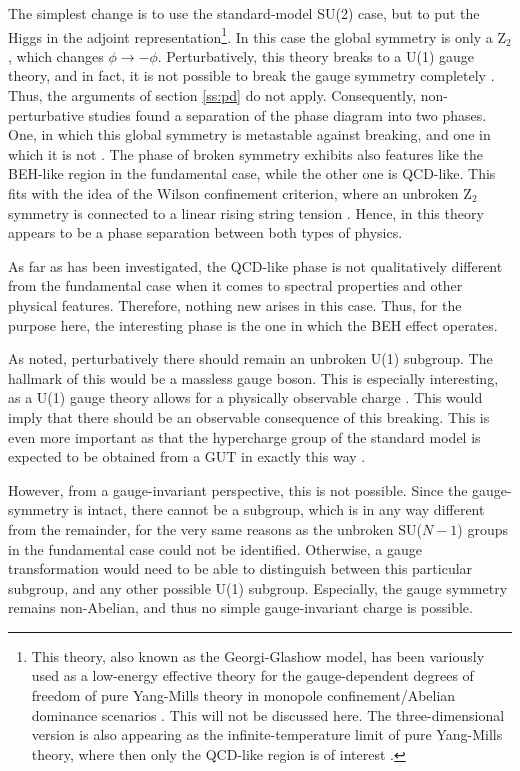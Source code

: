 \documentclass[final,12pt,3p,longtitle]{elsarticle}
\newcommand*{\1}{1\!\!\!\bot}
\begin{document}
The simplest change is to use the standard-model SU(2) case, but to put the Higgs in the adjoint representation\footnote{This theory, also known as the Georgi-Glashow model, has been variously used as a low-energy effective theory for the gauge-dependent degrees of freedom of pure Yang-Mills theory in monopole confinement/Abelian dominance scenarios \cite{Greensite:2011zz,Ripka:2003vv,Kondo:2016ywd}. This will not be discussed here. The three-dimensional version is also appearing as the infinite-temperature limit of pure Yang-Mills theory, where then only the QCD-like region is of interest \cite{Kajantie:1995dw,Maas:2011se,Hart:1999dj}.}. In this case the global symmetry is only a Z$_2$, which changes $\phi\to-\phi$. Perturbatively, this theory breaks to a U(1) gauge theory, and in fact, it is not possible to break the gauge symmetry completely \cite{O'Raifeartaigh:1986vq}. Thus, the arguments of section \ref{ss:pd} do not apply. Consequently, non-perturbative studies found a separation of the phase diagram into two phases. One, in which this global symmetry is metastable against breaking, and one in which it is not \cite{Lang:1981qg,Drouffe:1984hb,Baier:1986ni,Capri:2012cr,Kondo:2016ywd}. The phase of broken symmetry exhibits also features like the BEH-like region in the fundamental case, while the other one is QCD-like. This fits with the idea of the Wilson confinement criterion, where an unbroken Z$_2$ symmetry is connected to a linear rising string tension \cite{Greensite:2011zz,Gattringer:2010zz}. Hence, in this theory appears to be a phase separation between both types of physics.

As far as has been investigated, the QCD-like phase is not qualitatively different from the fundamental case when it comes to spectral properties and other physical features. Therefore, nothing new arises in this case. Thus, for the purpose here, the interesting phase is the one in which the BEH effect operates. 

As noted, perturbatively there should remain an unbroken U(1) subgroup. The hallmark of this would be a massless gauge boson. This is especially interesting, as a U(1) gauge theory allows for a physically observable charge \cite{Haag:1992hx}. This would imply that there should be an observable consequence of this breaking. This is even more important as that the hypercharge group of the standard model is expected to be obtained from a GUT in exactly this way \cite{Bohm:2001yx,Langacker:1980js}.

However, from a gauge-invariant perspective, this is not possible. Since the gauge-symmetry is intact, there cannot be a subgroup, which is in any way different from the remainder, for the very same reasons as the unbroken SU($N-1$) groups in the fundamental case could not be identified. Otherwise, a gauge transformation would need to be able to distinguish between this particular subgroup, and any other possible U(1) subgroup. Especially, the gauge symmetry remains non-Abelian, and thus no simple gauge-invariant charge is possible.
\end{document}
